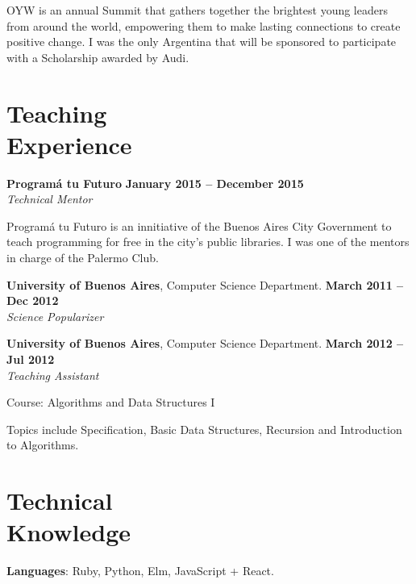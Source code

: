 \documentclass[margin,line]{resume}
\begin{document}
\begin{resume}
OYW is an annual Summit that gathers together the brightest young leaders from around the world, empowering them to make lasting connections to create positive change.  I was the only Argentina that will be sponsored to participate with a Scholarship awarded by Audi.
\newpage

\section{\mysidestyle Teaching\\Experience}

\textbf{Program\'a tu Futuro} \hfill \textbf{January 2015 --  December 2015}
\\
\textsl{Technical Mentor} \hfill 
\begin{list2}
	\item Program\'a tu Futuro is an innitiative of the Buenos Aires City Government to teach programming for free in the city's public libraries. I was one of the mentors in charge of the Palermo Club.
\end{list2}\vspace{-1.5mm}

\textbf{University of Buenos Aires}, Computer Science Department. \hfill \textbf{March 2011 --  Dec 2012}
\\
\textsl{Science Popularizer} \hfill 

\textbf{University of Buenos Aires}, Computer Science Department. \hfill \textbf{March 2012 --  Jul 2012}
\\
\textsl{Teaching Assistant} \hfill
\begin{list2}
	\item Course: Algorithms and Data Structures I
	\item Topics include Specification, Basic Data Structures, Recursion and Introduction to Algorithms.
\end{list2}\vspace{-1.5mm}

\vspace{2mm}


\section{\mysidestyle Technical\\Knowledge}


\textbf{Languages}: Ruby, Python, Elm, JavaScript + React. \vspace{-2mm}
    

\end{resume}
\end{document}
